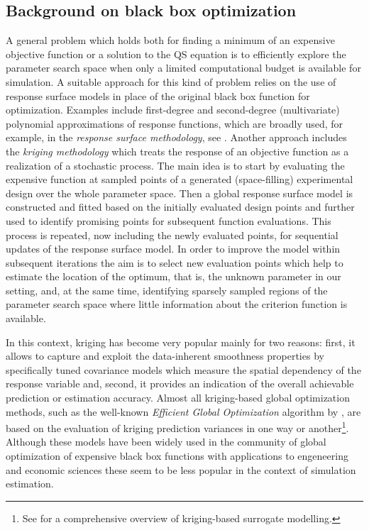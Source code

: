 \subsection{Background on black box optimization}
A general problem which holds both for finding a minimum of an expensive
objective function or a solution to the QS equation is to efficiently explore
the parameter search space when only a limited computational budget is
available for simulation. A suitable approach for this kind of problem relies on
the use of response surface models in place of the original black box function for optimization.
Examples include first-degree and second-degree (multivariate) polynomial
approximations of response functions, which are broadly used, for example, in
the \emph{response surface methodology}, see \citet{ref:Myers1995}. Another
approach includes the \emph{kriging methodology}
\citep[see, e.\,g.][]{ref:Sacksb1989,ref:Cressie1993,ref:Kleijnen2009} which treats the response of
an objective function as a realization of a stochastic process. The main idea is to start by evaluating
the expensive function at sampled points of a generated (space-filling)
experimental design over the whole parameter space.
Then a global response surface model is constructed and fitted based on the
initially evaluated design points and further used to identify promising points
for subsequent function evaluations. This process is repeated, now including the
newly evaluated points, for sequential updates of the response surface model.
In order to improve the model within subsequent iterations the aim is to select
new evaluation points which help to estimate the location of the optimum, that is, the unknown parameter
in our setting, and, at the same time, identifying sparsely sampled regions of
the parameter search space where little information about the criterion
function is available.\par
%
In this context, kriging has become very popular mainly for two reasons: first,
it allows to capture and exploit the data-inherent smoothness properties by
specifically tuned covariance models which measure the spatial dependency of the
response variable and, second, it provides an indication of the overall
achievable prediction or estimation accuracy. Almost all kriging-based global
optimization methods, such as the well-known \emph{Efficient Global
Optimization} algorithm by \citet{ref:Jones1998}, are based on the evaluation of
kriging prediction variances in one way or another\footnote{See \citet{ref:Jones2001} for a comprehensive overview
of kriging-based surrogate modelling.}. Although these models have been widely used
in the community of global optimization of expensive black box functions with applications to engeneering and
economic sciences these seem to be less popular in the context of
simulation estimation.\par
%
